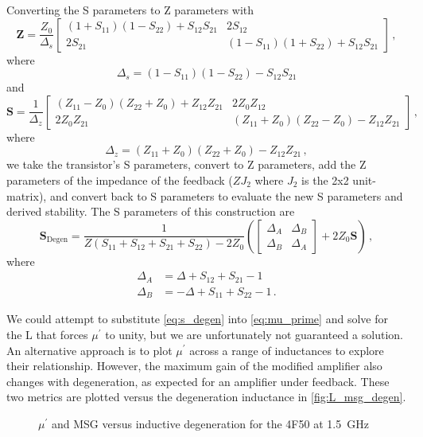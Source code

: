 Converting the S parameters to Z parameters with
%
\begin{equation}
    \mathbf{Z} = \frac{Z_0}{\Delta_s}
    \begin{bmatrix}
    (1+S_{11})(1-S_{22})+S_{12}S_{21} & 2S_{12} \\
    2S_{21} & (1-S_{11})(1+S_{22})+S_{12}S_{21}
    \end{bmatrix}\,,
    \label{eq:s2z}
\end{equation}
%
where
%
\begin{equation*}
    \Delta_s = (1-S_{11})(1-S_{22})-S_{12}S_{21}
\end{equation*}
and
%
\begin{equation}
    \mathbf{S} = \frac{1}{\Delta_z}
    \begin{bmatrix}
    (Z_{11}-Z_0)(Z_{22}+Z_0)+Z_{12}Z_{21} & 2Z_0Z_{12} \\
    2Z_0Z_{21} & (Z_{11}+Z_0)(Z_{22}-Z_0)-Z_{12}Z_{21}
    \end{bmatrix}\,,
    \label{eq:z2s}
\end{equation}
%
where
%
\begin{equation*}
    \Delta_z = (Z_{11}+Z_0)(Z_{22}+Z_0)-Z_{12}Z_{21}\,,
\end{equation*}
%
we take the transistor's S parameters, convert to Z parameters, add the Z parameters of the impedance of the feedback ($ZJ_2$ where $J_2$ is the 2x2 unit-matrix), and convert back to S parameters to evaluate the new S parameters and derived stability.
The S parameters of this construction are
%
\begin{equation}
    \mathbf{S}_\text{Degen} = \frac{1}{Z(S_{11}+S_{12}+S_{21}+S_{22}) - 2Z_0}\left(\begin{bmatrix}
        \Delta_A & \Delta_B \\
        \Delta_B & \Delta_A
    \end{bmatrix}
    +
    2Z_0\mathbf{S}
    \right)\,,
    \label{eq:s_degen}
\end{equation}
%
where
%
\begin{align*}
    \Delta_A &= \Delta + S_{12}+S_{21} - 1 \\
    \Delta_B &= -\Delta + S_{11}+S_{22} - 1\,.
\end{align*}

We could attempt to substitute \autoref{eq:s_degen} into \autoref{eq:mu_prime} and solve for the L that forces $\mu^\prime$ to unity, but we are unfortunately not guaranteed a solution.
An alternative approach is to plot $\mu^\prime$ across a range of inductances to explore their relationship.
However, the maximum gain of the modified amplifier also changes with degeneration, as expected for an amplifier under feedback.
These two metrics are plotted versus the degeneration inductance in \autoref{fig:L_msg_degen}.
%
\begin{figure}[ht!]%
    \centering
    \subfloat{}%
    \quad%
    \subfloat{}%
    \caption{$\mu^\prime$ and MSG versus inductive degeneration for the 4F50 at \qty{1.5}{\GHz}}%
    \label{fig:L_msg_degen}%
\end{figure}

